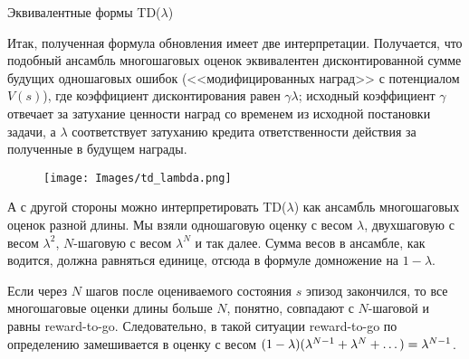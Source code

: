 \begin{theoremBox}[label=th:tdlambda]{Эквивалентные формы TD($\lambda$)}


\end{theoremBox}

Итак, полученная формула обновления имеет две интерпретации. Получается, что подобный ансамбль многошаговых оценок эквивалентен дисконтированной сумме будущих одношаговых ошибок (<<модифицированных наград>> с потенциалом $V(s)$), где коэффициент дисконтирования равен $\gamma \lambda$; исходный коэффициент $\gamma$ отвечает за затухание ценности наград со временем из исходной постановки задачи, а $\lambda$ соответствует затуханию кредита ответственности действия за полученные в будущем награды.

\begin{wrapfigure}{r}{0.4\textwidth}
\vspace{-0.4cm}
\centering
\texttt{[image: Images/td\_lambda.png]}
\vspace{-0.7cm}
\end{wrapfigure}

А с другой стороны можно интерпретировать TD($\lambda$) как ансамбль многошаговых оценок разной длины. Мы взяли одношаговую оценку с весом $\lambda$, двухшаговую с весом $\lambda^2$, $N$-шаговую с весом $\lambda^N$ и так далее. Сумма весов в ансамбле, как водится, должна равняться единице, отсюда в формуле домножение на $1 - \lambda$.

Если через $N$ шагов после оцениваемого состояния $s$ эпизод закончился, то все многошаговые оценки длины больше $N$, понятно, совпадают с $N$-шаговой и равны reward-to-go. Следовательно, в такой ситуации reward-to-go по определению замешивается в оценку с весом $(1 - \lambda)(\lambda^{N-1} + \lambda^{N} + \dots) \HM= \lambda^{N-1}$.

